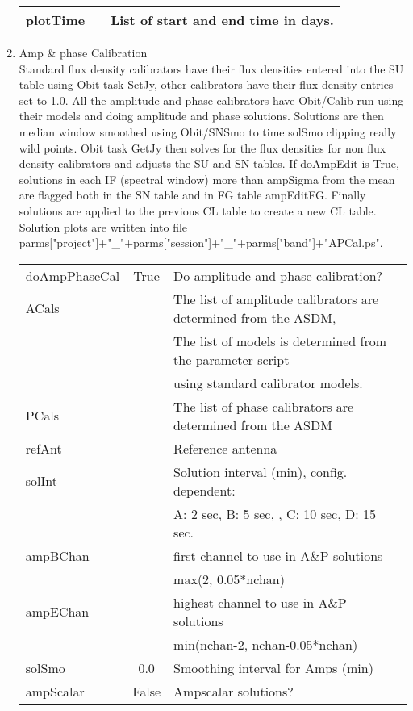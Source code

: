 \documentclass[11pt]{article}
\begin{document}
\begin{enumerate}
\begin{center}
\begin{tabular}{|l|c|l|}
plotTime       & & List of start and end time in days.\\
\hline
\end{tabular}
\end{center}
\newpage
%
\item Amp \& phase Calibration \\
Standard flux density calibrators have their flux densities entered
into the SU table using Obit task SetJy, other calibrators have their
flux density entries set to 1.0.
All the amplitude and phase calibrators have Obit/Calib run using
their models and doing amplitude and phase solutions.
Solutions are then median window smoothed using Obit/SNSmo to time
solSmo clipping really wild points.
Obit task GetJy then solves for the flux densities for non flux
density calibrators and adjusts the SU and SN tables. If doAmpEdit is
True, solutions in each IF (spectral window) more than ampSigma from
the mean are flagged both in the SN table and in FG table ampEditFG.
Finally solutions are applied to the previous CL table to create a new
CL table.
Solution plots are written into file\\
parms["project"]+"\_"+parms["session"]+"\_"+parms["band"]+"APCal.ps".
\begin{center}
\begin{tabular}{|l|c|l|}
\hline
doAmpPhaseCal  & True & Do amplitude and phase calibration? \\
ACals  &  & The list of amplitude calibrators are determined from the ASDM, \\
  &  & The list of models is determined from the parameter script \\
  & & using standard calibrator models. \\
PCals  &  &  The list of phase calibrators are determined from the ASDM\\
refAnt  &  & Reference antenna \\
solInt  &  &  Solution interval (min), config. dependent:\\
  &  & A: 2 sec, B: 5 sec, , C:  10 sec, D: 15 sec.\\
ampBChan  &  & first channel to use in A\&P solutions \\
  &  &   max(2, 0.05*nchan)\\
ampEChan  &  &  highest channel to use in A\&P solutions\\
  &  &  min(nchan-2, nchan-0.05*nchan)\\
solSmo  & 0.0 &  Smoothing interval for Amps (min)\\
ampScalar  & False &  Ampscalar solutions?\\

\end{tabular}
\end{center}
\end{enumerate}
\end{document}
